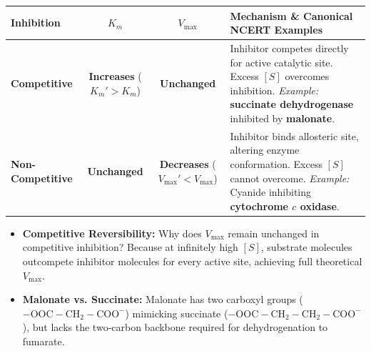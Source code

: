 \documentclass[10pt,twoside,openright]{book}
\begin{document}
\begin{center}
\footnotesize
\setlength{\tabcolsep}{2.5pt}
\renewcommand{\arraystretch}{1.2}
\begin{tabularx}{\linewidth}{l c c >{\RaggedRight}X}
\toprule
\textbf{Inhibition} & \textbf{$K_m$} & \textbf{$V_{\max}$} & \textbf{Mechanism \& Canonical NCERT Examples} \\
\midrule
\textbf{Competitive} & \textbf{Increases} \newline ($K_m' > K_m$) & \textbf{Unchanged} & Inhibitor competes directly for active catalytic site. Excess $[S]$ overcomes inhibition. \newline \textit{Example:} \textbf{succinate dehydrogenase} inhibited by \textbf{malonate}. \\
\midrule
\textbf{Non-Competitive} & \textbf{Unchanged} & \textbf{Decreases} \newline ($V_{\max}' < V_{\max}$) & Inhibitor binds allosteric site, altering enzyme conformation. Excess $[S]$ cannot overcome. \newline \textit{Example:} Cyanide inhibiting \textbf{cytochrome $c$ oxidase}. \\
\bottomrule
\end{tabularx}
\end{center}

\begin{trapbox}
\begin{itemize}
  \item \textbf{Competitive Reversibility:} Why does $V_{\max}$ remain unchanged in competitive inhibition? Because at infinitely high $[S]$, substrate molecules outcompete inhibitor molecules for every active site, achieving full theoretical $V_{\max}$.
  \item \textbf{Malonate vs. Succinate:} Malonate has two carboxyl groups ($-\mathrm{OOC-CH_2-COO^-}$) mimicking succinate ($-\mathrm{OOC-CH_2-CH_2-COO^-}$), but lacks the two-carbon backbone required for dehydrogenation to fumarate.
\end{itemize}
\end{trapbox}
\end{document}

